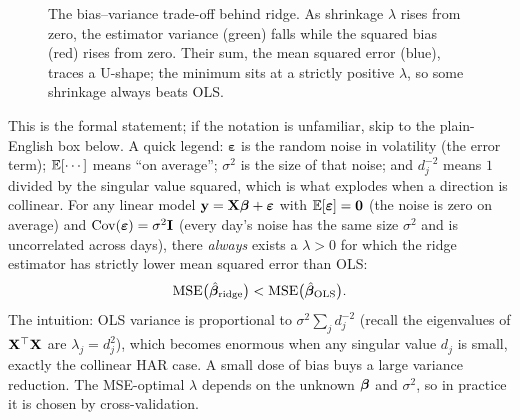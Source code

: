 \begin{figure}[htbp]
\centering
{}
\caption{The bias--variance trade-off behind ridge.
As shrinkage $\lambda$ rises from zero, the estimator variance (green) falls while the squared bias (red) rises from zero.
Their sum, the mean squared error (blue), traces a U-shape; the minimum sits at a strictly positive $\lambda$, so some shrinkage always beats OLS.}
\label{fig:bias-variance-mse}
\end{figure}

\begin{keyresult}
This is the formal statement; if the notation is unfamiliar, skip to the plain-English box below.
A quick legend: $\bm{\varepsilon}$ is the random noise in volatility (the error term); $\mathbb{E}[\cdots]$ means ``on average''; $\sigma^2$ is the size of that noise; and $d_j^{-2}$ means $1$ divided by the singular value squared, which is what explodes when a direction is collinear.
For any linear model $\mathbf{y} = \mathbf{X}\bm{\beta} + \bm{\varepsilon}$ with $\mathbb{E}[\bm{\varepsilon}] = \mathbf{0}$ (the noise is zero on average) and $\operatorname{Cov}(\bm{\varepsilon}) = \sigma^2\mathbf{I}$ (every day's noise has the same size $\sigma^2$ and is uncorrelated across days), there \emph{always} exists a $\lambda > 0$ for which the ridge estimator has strictly lower mean squared error than OLS:
\[
  \mathrm{MSE}\bigl(\hat{\bm{\beta}}_{\mathrm{ridge}}\bigr) < \mathrm{MSE}\bigl(\hat{\bm{\beta}}_{\mathrm{OLS}}\bigr).
\]
The intuition: OLS variance is proportional to $\sigma^2\sum_j d_j^{-2}$ (recall the eigenvalues of $\mathbf{X}^\top\mathbf{X}$ are $\lambda_j = d_j^2$), which becomes enormous when any singular value $d_j$ is small, exactly the collinear HAR case.
A small dose of bias buys a large variance reduction.
The MSE-optimal $\lambda$ depends on the unknown $\bm{\beta}$ and $\sigma^2$, so in practice it is chosen by cross-validation.
\end{keyresult}

